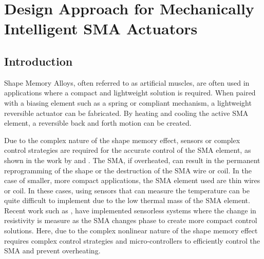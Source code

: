 
\chapter{Design Approach for Mechanically Intelligent SMA Actuators}\label{chap:integrated-control}


\section{Introduction}
Shape Memory Alloys, often referred to as artificial muscles, are often used in applications where a compact and lightweight solution is required. When paired with a biasing element such as a spring or compliant mechanism, a lightweight reversible actuator can be fabricated. By heating and cooling the active SMA element, a reversible back and forth motion can be created.

Due to the complex nature of the shape memory effect, sensors or complex control strategies are required for the accurate control of the SMA element, as shown in the work by \todocite and \todocite. The SMA, if overheated, can result in the permanent reprogramming of the shape or the destruction of the SMA wire or coil. In the case of smaller, more compact applications, the SMA element used are thin wires or coil. In these cases, using sensors that can measure the temperature can be quite difficult to implement due to the low thermal mass of the SMA element. Recent work such as \todocite, have implemented sensorless systems where the change in resistivity is measure as the SMA changes phase to create more compact control solutions. Here, due to the complex nonlinear nature of the shape memory effect requires complex control strategies and micro-controllers to efficiently control the SMA and prevent overheating.

